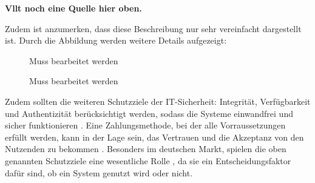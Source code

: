 \textbf{Vllt noch eine Quelle hier oben.}


Zudem ist anzumerken, dass diese Beschreibung nur sehr vereinfacht dargestellt ist. Durch die 
\cite{refart:JTAS} Abbildung werden weitere Details aufgezeigt: 

\begin{figure}[H]
    \caption{Muss bearbeitet werden}
    \label{fig:refart:JTAS}
\end{figure}

\begin{figure}[H]
    \caption{Muss bearbeitet werden}
    \label{fig:refart:JTAS_2}
\end{figure}


Zudem sollten die weiteren Schutzziele der IT-Sicherheit: Integrität, Verfügbarkeit und Authentizität
berücksichtigt werden, sodass die Systeme einwandfrei und sicher funktionieren \cite{refip:GMPS}. 
Eine Zahlungsmethode, bei der alle Vorraussetzungen erfüllt werden, kann in der Lage sein, das Vertrauen 
und die Akzeptanz von den Nutzenden zu bekommen \cite{refart:HARE}. Besonders im deutschen Markt, spielen
die oben genannten Schutzziele eine wesentliche Rolle \cite{refip:DKAM}, da sie ein Entscheidungsfaktor 
dafür sind, ob ein System genutzt wird oder nicht.


